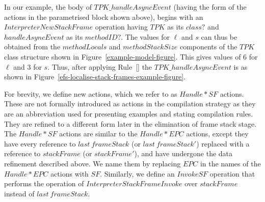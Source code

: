 In our example, the body of $TPK\_handleAsyncEvent$ (having the form
of the actions in the parametrised block shown above), begins with an
$InterpreterNewStackFrame$ operation having $TPK$ as its $class?$ and
$handleAsyncEvent$ as its $methodID?$.
The values for $\ell$ and $s$ can thus be obtained from the
$methodLocals$ and $methodStackSize$ components of the $TPK$ class
structure shown in Figure~\ref{example-model-figure}.
This gives values of $6$ for $\ell$ and $3$ for $s$.
Thus, after applying
Rule~[] the
$TPK\_handleAsyncEvent$ is as shown in
Figure~\ref{efs-localise-stack-frames-example-figure}.

For brevity, we define new actions, which we refer to as $Handle*SF$
actions.
These are not formally introduced as actions in the compilation
strategy as they are an abbreviation used for presenting examples and
stating compilation rules.
They are refined to a different form later in the elimination of frame
stack stage.
The $Handle*SF$ actions are similar to the $Handle*EPC$ actions,
except they have every reference to $last~frameStack$ (or
$last~frameStack'$) replaced with a reference to $stackFrame$ (or
$stackFrame'$), and have undergone the data refinement described
above.
We name them by replacing $EPC$ in the names of the $Handle*EPC$
actions with $SF$.
Similarly, we define an $InvokeSF$ operation that performs the
operation of $InterpreterStackFrameInvoke$ over $stackFrame$ instead
of $last~frameStack$.

